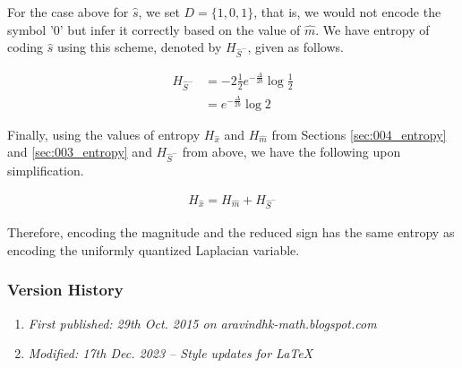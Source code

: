 For the case above for $\hat{s}$, we set $D = \{1, 0, 1\}$, that is, we would not encode the symbol '0' but infer it correctly based on the value of $\hat{m}$. We have entropy of coding $\hat{s}$ using this scheme, denoted by $H_{\hat{S}^-}$, given as follows.

\begin{align}H_{\hat{S}^-} &= -2\frac{1}{2} e^{-\frac{\Delta}{2b}} \log \frac{1}{2}\nonumber\\ &= e^{-\frac{\Delta}{2b}} \log 2\end{align}

Finally, using the values of entropy $H_{\hat{x}}$ and $H_{\hat{m}}$ from Sections \ref{sec:004_entropy} and \ref{sec:003_entropy} and $H_{\hat{S}^-}$ from above, we have the following upon simplification.

\begin{align}H_{\hat{x}} = H_{\hat{m}} + H_{\hat{S}^-}\end{align}

Therefore, encoding the magnitude and the reduced sign has the same entropy as encoding the uniformly quantized Laplacian variable.

\subsubsection{Version History}
\begin{enumerate}
	\item \emph{First published: 29th Oct. 2015 on aravindhk-math.blogspot.com}
	\item \emph{Modified: 17th Dec. 2023 -- Style updates for \LaTeX}
\end{enumerate}
